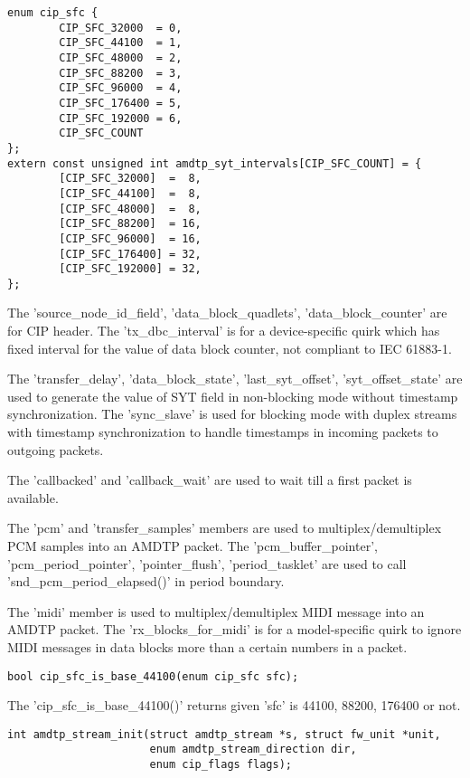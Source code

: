 \documentclass[onecolumn]{jarticle}
\begin{document}
\begin{verbatim}
enum cip_sfc {
        CIP_SFC_32000  = 0,
        CIP_SFC_44100  = 1,
        CIP_SFC_48000  = 2,
        CIP_SFC_88200  = 3,
        CIP_SFC_96000  = 4,
        CIP_SFC_176400 = 5,
        CIP_SFC_192000 = 6,
        CIP_SFC_COUNT
};
extern const unsigned int amdtp_syt_intervals[CIP_SFC_COUNT] = {
        [CIP_SFC_32000]  =  8,
        [CIP_SFC_44100]  =  8,
        [CIP_SFC_48000]  =  8,
        [CIP_SFC_88200]  = 16,
        [CIP_SFC_96000]  = 16,
        [CIP_SFC_176400] = 32,
        [CIP_SFC_192000] = 32,
};
\end{verbatim}


The 'source\_node\_id\_field', 'data\_block\_quadlets', 'data\_block\_counter' are for CIP header. The 'tx\_dbc\_interval' is for a device-specific quirk which has fixed interval for the value of data block counter, not compliant to IEC 61883-1.

The 'transfer\_delay', 'data\_block\_state', 'last\_syt\_offset', 'syt\_offset\_state' are used to generate the value of SYT field in non-blocking mode without timestamp synchronization. The 'sync\_slave' is used for blocking mode with duplex streams with timestamp synchronization to handle timestamps in incoming packets to outgoing packets.

The 'callbacked' and 'callback\_wait' are used to wait till a first packet is available.

The 'pcm' and 'transfer\_samples' members are used to multiplex/demultiplex PCM samples into an AMDTP packet. The 'pcm\_buffer\_pointer', 'pcm\_period\_pointer', 'pointer\_flush', 'period\_tasklet' are used to call 'snd\_pcm\_period\_elapsed()' in period boundary.

The 'midi' member is used to multiplex/demultiplex MIDI message into an AMDTP packet. The 'rx\_blocks\_for\_midi' is for a model-specific quirk to ignore MIDI messages in data blocks more than a certain numbers in a packet.

\begin{verbatim}
bool cip_sfc_is_base_44100(enum cip_sfc sfc);
\end{verbatim}

The 'cip\_sfc\_is\_base\_44100()' returns given 'sfc' is 44100, 88200, 176400 or not.

\begin{verbatim}
int amdtp_stream_init(struct amdtp_stream *s, struct fw_unit *unit,
                      enum amdtp_stream_direction dir,
                      enum cip_flags flags);
\end{verbatim}
\end{document}
